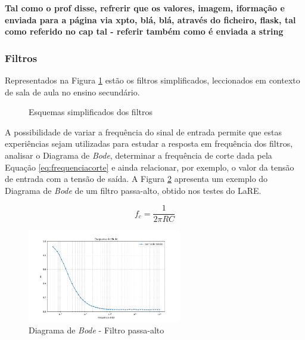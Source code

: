 \textbf{Tal como o prof disse, refrerir que os valores, imagem, iformação e enviada para a página via xpto, blá, blá, através do ficheiro, flask, tal como referido no cap tal - referir também como é enviada a string}

\subsubsection{Filtros}
\label{sec:filtros}
Representados na Figura \ref{fig:filtrosesqgeral} estão os filtros simplificados, leccionados em contexto de sala de aula no ensino secundário.

\begin{figure}[hbtp]
	\centering%
		\centering
		\qquad
		\caption{Esquemas simplificados dos filtros}%
		\label{fig:filtrosesqgeral}%
	\end{figure}

A possibilidade de variar a frequência do sinal de entrada permite que estas experiências sejam utilizadas para estudar a resposta em frequência dos filtros, analisar o Diagrama de \textit{Bode}, determinar a frequência de corte dada pela Equação \ref{eq:frequenciacorte} e ainda relacionar, por exemplo, o valor da tensão de entrada com a tensão de saída. A Figura \ref{fig:diagramabode} apresenta um exemplo do Diagrama de \textit{Bode} de um filtro passa-alto, obtido nos testes do LaRE.

\begin{equation} \label{eq:frequenciacorte}
	f_{c} = \frac{1}{2\pi RC}
\end{equation}

\begin{figure}[hbtp]
	\centering
	\includegraphics[width=0.6\textwidth]{figures/bode_lpf.png}
	\caption{Diagrama de \textit{Bode} - Filtro passa-alto}
	\label{fig:diagramabode}
\end{figure}

